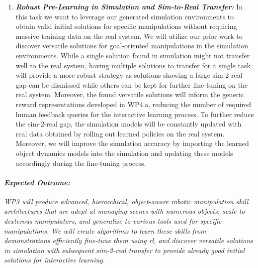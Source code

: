 \documentclass{erc-B2}
\begin{document}
\begin{enumerate}
\item \textit{\textbf{Robust Pre-Learning in Simulation and  Sim-to-Real Transfer:}} In this task we want to leverage our generated simulation environments to obtain valid initial solutions for specific manipulations without requiring massive training data on the real system. 
We will utilize our prior work \cite{celik2022specializing} to discover versatile solutions for goal-oriented manipulations in the simulation environments. While a single solution found in simulation might not transfer well to the real system, having multiple solutions to transfer for a single task will provide a more robust strategy as solutions showing a large sim-2-real gap can be dismissed while others can be kept for further fine-tuning on the real system. Moreover, the found versatile solutions will inform the generic reward representations developed in WP4.a, reducing the number of required human feedback queries for the interactive learning process. 
To further reduce the sim-2-real gap, the simulation models will be constantly updated with real data obtained by rolling out learned policies on the real system. Moreover, we will improve the simulation accuracy by importing the learned object dynamics models into the simulation and updating these models accordingly during the fine-tuning process.
\end{enumerate}
\paragraph{\textit{Expected Outcome:}} \textit{WP3 will produce advanced, hierarchical, object-aware robotic manipulation skill architectures that are adept at managing scenes with numerous objects, scale to dexterous manipulators, and generalize to various tools used for specific manipulations. We will create algorithms to learn these skills from demonstrations efficiently fine-tune them using \gls*{rl}, and discover versatile solutions in simulation with subsequent sim-2-real transfer to provide already good initial solutions for interactive learning.} %

\end{document}
